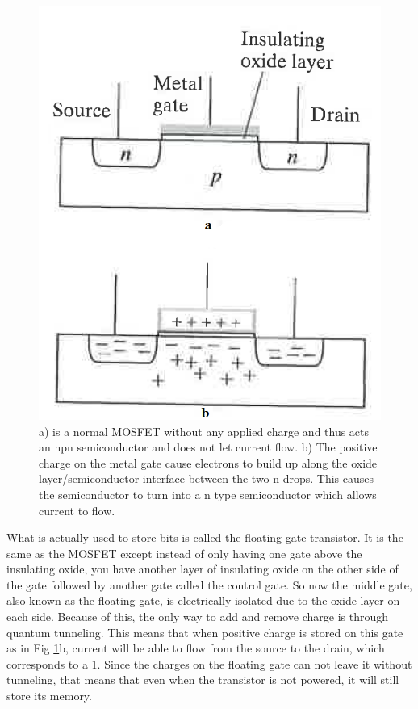 \documentclass[ notitlepage, numerical, 11pt]{revtex4-1} %
\begin{document}
\begin{figure}[H]
\centerline{\includegraphics[scale=.45]{mosfet.png}}
\caption{ a) is a normal MOSFET without any applied charge and thus acts an npn semiconductor and does not let current flow. b) The positive charge on the metal gate cause electrons to build up along the oxide layer/semiconductor interface between the two n drops. This causes the semiconductor to turn into a n type semiconductor which allows current to flow.}
\label{mosfet}
\end{figure}

What is actually used to store bits is called the floating gate transistor. It is the same as the MOSFET except instead of only having one gate above the insulating oxide, you have another layer of insulating oxide on the other side of the gate followed by another gate called the control gate. So now the middle gate, also known as the floating gate, is electrically isolated due to the oxide layer on each side. Because of this, the only way to add and remove charge is through quantum tunneling. This means that when positive charge is stored on this gate as in Fig \ref{mosfet}b, current will be able to flow from the source to the drain, which corresponds to a 1. Since the charges on the floating gate can not leave it without tunneling, that means that even when the transistor is not powered, it will still store its memory. 
\end{document}
